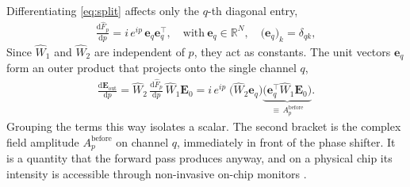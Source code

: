 \begin{appendices}
Differentiating \eqref{eq:split} affects only the $q$-th diagonal entry,
\begin{align*}
    \frac{\mathrm{d}\hat{F}_{p}}{\mathrm{d}p}
    = i\,e^{ip}\,\mathbf{e}_{q}\mathbf{e}_{q}^{\top},
    \quad \text{with}\
    \mathbf{e}_{q}\in\mathbb{R}^{N},\quad
    \bigl(\mathbf{e}_{q}\bigr)_{k}=\delta_{qk},
\end{align*}
Since $\hat{W}_1$ and $\hat{W}_2$ are independent of $p$, they act as constants.
The unit vectors $\mathbf{e}_q$ form an outer product that projects onto the single channel $q$,
\begin{align}
    \frac{\mathrm{d}\mathbf{E}_{\mathrm{out}}}{\mathrm{d}p}
    = \hat{W}_{2}\,\frac{\mathrm{d}\hat{F}_{p}}{\mathrm{d}p}\,
      \hat{W}_{1}\mathbf{E}_{0}
    = i\,e^{i p}\;
      \bigl(\hat{W}_{2}\mathbf{e}_{q}\bigr)
      \underbrace{\bigl(\mathbf{e}_{q}^{\top}\hat{W}_{1}\mathbf{E}_{0}\bigr)}
      _{\textstyle \equiv\, A^{\text{before}}_{p}}.
    \label{eq:dEdp}
\end{align}
Grouping the terms this way isolates a scalar. 
The second bracket is the complex field amplitude $A_p^{\text{before}}$ on channel $q$, immediately in front of the phase shifter. 
It is a quantity that the forward pass produces anyway, and on a physical chip its intensity is accessible through non-invasive on-chip monitors \cite{morichettiNonInvasiveOnChipLight2014}.


\end{appendices}
